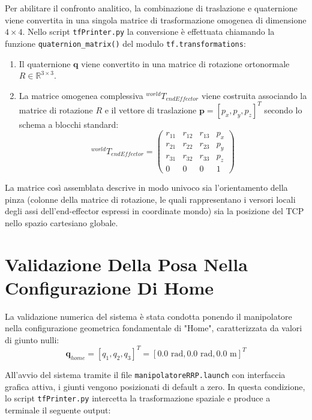 \documentclass[11pt, a4paper]{report}
\begin{document}
Per abilitare il confronto analitico, la combinazione di traslazione e quaternione viene convertita in una singola matrice di trasformazione omogenea di dimensione $4 \times 4$. Nello script \texttt{tfPrinter.py} la conversione è effettuata chiamando la funzione \texttt{quaternion\_matrix()} del modulo \texttt{tf.transformations}:
\begin{enumerate}
    \item Il quaternione \(\mathbf{q}\) viene convertito in una matrice di rotazione ortonormale \(R \in \mathbb{R}^{3 \times 3}\).
    \item La matrice omogenea complessiva $^{world}T_{endEffector}$ viene costruita associando la matrice di rotazione \(R\) e il vettore di traslazione \(\mathbf{p} = [p_x, p_y, p_z]^T\) secondo lo schema a blocchi standard:
    \[
        ^{world}T_{endEffector} =
        \begin{pmatrix}
            r_{11} & r_{12} & r_{13} & p_x \\
            r_{21} & r_{22} & r_{23} & p_y \\
            r_{31} & r_{32} & r_{33} & p_z \\
            0 & 0 & 0 & 1
        \end{pmatrix}
    \]
\end{enumerate}

La matrice così assemblata descrive in modo univoco sia l'orientamento della pinza (colonne della matrice di rotazione, le quali rappresentano i versori locali degli assi dell'end-effector espressi in coordinate mondo) sia la posizione del TCP nello spazio cartesiano globale.
\newpage

\section{Validazione Della Posa Nella Configurazione Di Home}
\label{sec:validazione_posa}

La validazione numerica del sistema è stata condotta ponendo il manipolatore nella configurazione geometrica fondamentale di "Home", caratterizzata da valori di giunto nulli:
\[
    \mathbf{q}_{home} = [q_1, q_2, q_3]^T = [0.0 \text{ rad}, 0.0 \text{ rad}, 0.0 \text{ m}]^T
\]

All'avvio del sistema tramite il file \texttt{manipolatoreRRP.launch} con interfaccia grafica attiva, i giunti vengono posizionati di default a zero. In questa condizione, lo script \texttt{tfPrinter.py} intercetta la trasformazione spaziale e produce a terminale il seguente output:
\end{document}
